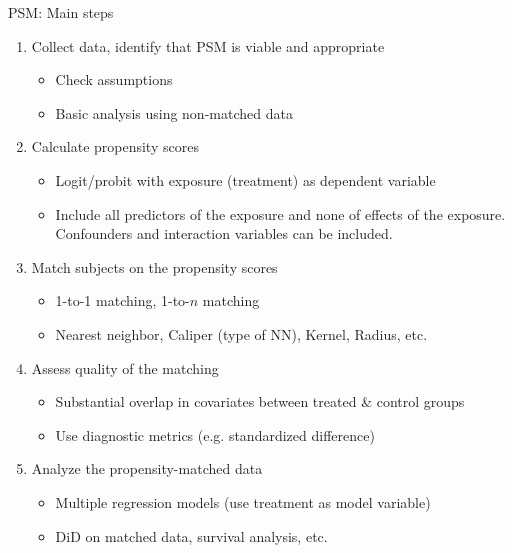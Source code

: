 \documentclass{beamer}
\begin{document}
\begin{frame}{PSM: Main steps}
\begin{enumerate}
    \item Collect data, identify that PSM is viable and appropriate
        \begin{itemize}
            \item Check assumptions
            \item Basic analysis using non-matched data
        \end{itemize}
    \item Calculate propensity scores
        \begin{itemize}
            \item Logit/probit with exposure (treatment) as dependent variable
            \item Include all predictors of the exposure and none of effects of the exposure. Confounders and interaction variables can be included.
        \end{itemize}
    \item Match subjects on the propensity scores
        \begin{itemize}
            \item 1-to-1 matching, 1-to-$n$ matching
            \item Nearest neighbor, Caliper (type of NN), Kernel, Radius, etc.
        \end{itemize}
    \item Assess quality of the matching\\
        \begin{itemize}
            \item Substantial overlap in covariates between treated \& control groups
            \item Use diagnostic metrics (e.g. standardized difference)
        \end{itemize}
    \item Analyze the propensity-matched data
        \begin{itemize}
            \item Multiple regression models (use treatment as model variable) 
            \item DiD on matched data, survival analysis, etc.
        \end{itemize}
\end{enumerate}
\end{frame}
\end{document}
